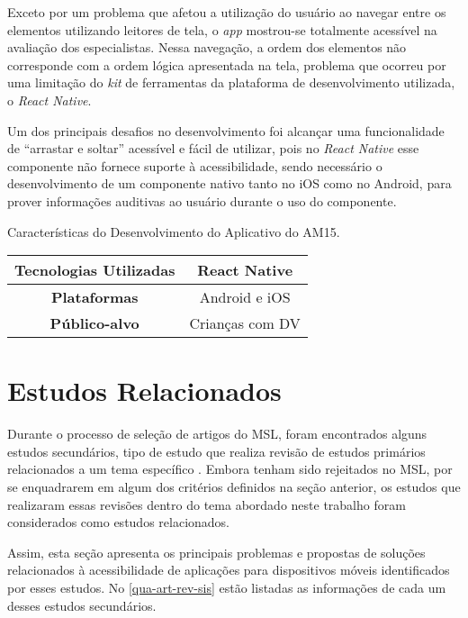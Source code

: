 Exceto por um problema que afetou a utilização do usuário ao navegar entre os elementos utilizando leitores de tela, o \emph{app}
mostrou-se totalmente acessível na avaliação dos especialistas. Nessa navegação, a ordem dos elementos não corresponde com a ordem
lógica apresentada na tela, problema que ocorreu por uma limitação do \emph{kit} de ferramentas da plataforma de desenvolvimento
utilizada, o \emph{React Native}.

Um dos principais desafios no desenvolvimento foi alcançar uma funcionalidade de ``arrastar e soltar'' acessível e fácil de utilizar,
pois no \emph{React Native} esse componente não fornece suporte à acessibilidade, sendo necessário o desenvolvimento de um componente
nativo tanto no iOS como no Android, para prover informações auditivas ao usuário durante o uso do componente.

\begin{quadro}[htb!]
  \caption{\label{qua-car-am15}Características do Desenvolvimento do Aplicativo do AM15.}
  \begin{tabular}{|c|c|}
    \hline
    \textbf{Tecnologias Utilizadas} & React Native    \\ \hline
    \textbf{Plataformas}            & Android e iOS   \\ \hline
    \textbf{Público-alvo}           & Crianças com DV \\
    \hline
  \end{tabular}
\end{quadro}

\section{Estudos Relacionados}

Durante o processo de seleção de artigos do MSL, foram encontrados alguns estudos secundários, tipo de estudo que realiza revisão de estudos primários
relacionados a um tema específico \cite{Kitchenham2007}. Embora tenham sido rejeitados no MSL, por se enquadrarem em algum dos critérios definidos
na seção anterior, os estudos que realizaram essas revisões dentro do tema abordado neste trabalho foram considerados como estudos relacionados.

Assim, esta seção apresenta os principais problemas e propostas de soluções relacionados à acessibilidade de aplicações para dispositivos móveis
identificados por esses estudos. No \autoref{qua-art-rev-sis} estão listadas as informações de cada um desses estudos secundários.

